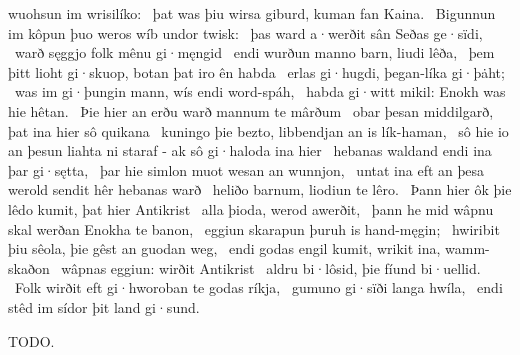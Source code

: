 wuohsun im wrisilíko: \hld\ þat was þiu wirsa giburd,
kuman fan Kaina. \hld\ Bigunnun im kôpun þuo
weros wíb undor twisk: \hld\ þas ward a·werðit sân
Seðas ge·sïdi, \hld\ warð sęggjo folk
mênu gi·męngid \hld\ endi wurðun manno barn,
liudi lêða, \hld\ þem þitt lioht gi·skuop,
botan þat iro ên habda \hld\ erlas gi·hugdi,
þegan-líka gi·þȧht; \hld\ was im gi·þungin mann,
wís endi word-spáh, \hld\ habda gi·witt mikil:
Enokh was hie hêtan. \hld\ Þie hier an erðu warð
mannum te mârðum \hld\ obar þesan middilgarð,
þat ina hier sô quikana \hld\ kuningo þie bezto,
libbendjan an is lík-haman, \hld\ sô hie io an þesun liahta ni staraf -
ak sô gi·haloda ina hier \hld\ hebanas waldand
endi ina þar gi·sętta, \hld\ þar hie simlon muot
wesan an wunnjon, \hld\ untat ina eft an þesa werold sendit
hêr hebanas warð \hld\ heliðo barnum,
liodiun te lêro. \hld\ Þann hier ôk þie lêdo kumit,
þat hier Antikrist \hld\ alla þioda,
werod awerðit, \hld\ þann he mid wâpnu skal
werðan Enokha te banon, \hld\ eggiun skarapun
þuruh is hand-męgin; \hld\ hwiribit þiu sêola,
þie gêst an guodan weg, \hld\ endi godas engil kumit,
wrikit ina, wamm-skaðon \hld\ wâpnas eggiun:
wirðit Antikrist \hld\ aldru bi·lôsid,
þie fíund bi·uellid. \hld\ Folk wirðit eft gi·hworoban
te godas ríkja, \hld\ gumuno gi·sïði
langa hwíla, \hld\ endi stêd im sídor þit land gi·sund.\eva

\bvb TODO.\evb\evg

\sectionline

